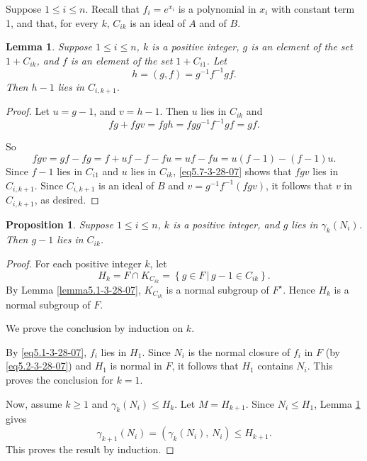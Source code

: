 \documentclass[mathscr]{amsart}
\theoremstyle{theorem}
\newtheorem{lemma}[theorem]{Lemma}
\newtheorem{proposition}[theorem]{Proposition}
\theoremstyle{definition}
\numberwithin{equation}{section}
\def \({\left(}
\def \){\right)}
\begin{document}
Suppose $1\leq i\leq n$.  Recall that $f_i=e^{x_i}$ is a polynomial
in $x_i$ with constant term 1, and that, for every $k$, $C_{ik}$ is
an ideal of $A$ and of $B$.  %

\begin{lemma}\label{lemma5.2-3-28-07}
Suppose $1\leq i\leq n$, $k$ is a positive integer, $g$ is an
element of the set $1+C_{ik}$, and $f$ is an element of the set
$1+C_{i1}$.  Let
$$
h=(g,f)=g^{-1}f^{-1}gf.
$$
Then $h-1$ lies in $C_{i,k+1}$.
\end{lemma}

\begin{proof}
Let $u=g-1$, and $v=h-1$.  Then $u$ lies in $C_{ik}$ and
$$
fg+fgv=fgh=fgg^{-1}f^{-1}gf=gf.
$$

So
\begin{equation}\label{eq5.7-3-28-07}
fgv=gf-fg=f+uf-f-fu=uf-fu=u(f-1)-(f-1)u.
\end{equation}
Since $f-1$ lies in $C_{i1}$ and $u$ lies in $C_{ik}$,
\eqref{eq5.7-3-28-07} shows that $fgv$ lies in $C_{i,k+1}$.  Since
$C_{i,k+1}$ is an ideal of $B$ and $v=g^{-1}f^{-1}(fgv)$, it follows
that $v$ in $C_{i,k+1}$, as desired.
\end{proof}

\begin{proposition}\label{prop5.3-3-28-7}
Suppose $1\leq i\leq n$, $k$ is a positive integer, and $g$ lies in
$\gamma_k\(N_i\)$.  Then $g-1$ lies in $C_{ik}$.
\end{proposition}

\begin{proof}
For each positive integer $k$, let
$$
H_k=F\cap K_{C_{ik}}=\left\{g\in F\,|\,g-1\in C_{ik}\right\}.
$$
By Lemma \ref{lemma5.1-3-28-07}, $K_{C_{ik}}$ is a normal subgroup
of $F^\star$.  Hence $H_k$ is a normal subgroup of $F$.

We prove the conclusion by induction on $k$.

By \eqref{eq5.1-3-28-07}, $f_i$ lies in $H_1$.  Since $N_i$ is the
normal closure of $f_i$ in $F$ (by \eqref{eq5.2-3-28-07}) and $H_1$
is normal in $F$, it follows that $H_1$ contains $N_i$.  This proves
the conclusion for $k=1$.

Now, assume $k\geq 1$ and $\gamma_k\(N_i\)\leq H_k$.  Let
$M=H_{k+1}$.  Since $N_i\leq H_1$, Lemma \ref{lemma5.2-3-28-07}
gives
$$
\gamma_{k+1}\(N_i\)=\(\gamma_k\(N_i\),\,N_i\)\leq H_{k+1}.
$$
This proves the result by induction.
\end{proof}
\end{document}
